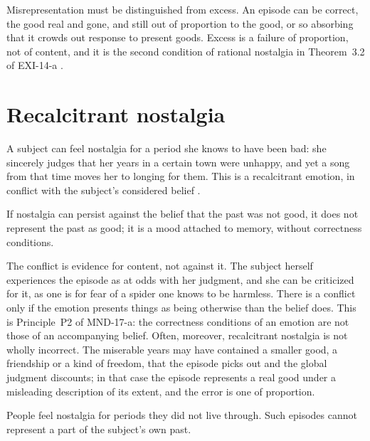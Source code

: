 \documentclass{situationist-preprint}
\begin{document}
\begin{remark}\label{r:excess}
Misrepresentation must be distinguished from excess. An episode can be correct, the good real and gone, and still out of proportion to the good, or so absorbing that it crowds out response to present goods. Excess is a failure of proportion, not of content, and it is the second condition of rational nostalgia in Theorem~3.2 of EXI-14-a \citep{deSousa1987}.
\end{remark}

\section{Recalcitrant nostalgia}

A subject can feel nostalgia for a period she knows to have been bad: she sincerely judges that her years in a certain town were unhappy, and yet a song from that time moves her to longing for them. This is a recalcitrant emotion, in conflict with the subject's considered belief \citep{Brady2009}.

\begin{objection}
If nostalgia can persist against the belief that the past was not good, it does not represent the past as good; it is a mood attached to memory, without correctness conditions.
\end{objection}

\begin{reply}
The conflict is evidence for content, not against it. The subject herself experiences the episode as at odds with her judgment, and she can be criticized for it, as one is for fear of a spider one knows to be harmless. There is a conflict only if the emotion presents things as being otherwise than the belief does. This is Principle~P2 of MND-17-a: the correctness conditions of an emotion are not those of an accompanying belief. Often, moreover, recalcitrant nostalgia is not wholly incorrect. The miserable years may have contained a smaller good, a friendship or a kind of freedom, that the episode picks out and the global judgment discounts; in that case the episode represents a real good under a misleading description of its extent, and the error is one of proportion.
\end{reply}

\begin{objection}
People feel nostalgia for periods they did not live through. Such episodes cannot represent a part of the subject's own past.
\end{objection}
\end{document}
